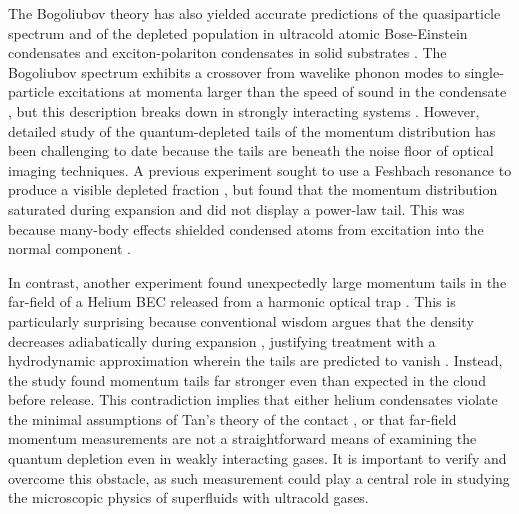 The Bogoliubov theory has also yielded accurate predictions of the quasiparticle spectrum \cite{lopes17_quasiparticle,vogels02} and of the depleted population in ultracold atomic Bose-Einstein condensates \cite{xu06,lopes17_depletion} and exciton-polariton condensates in solid substrates \cite{pieczarka20}. The Bogoliubov spectrum exhibits a crossover from wavelike phonon modes to single-particle excitations at momenta larger than the speed of sound in the condensate \cite{steinhauer03}, but this description breaks down in strongly interacting systems \cite{lopes17_quasiparticle}. However, detailed study of the quantum-depleted tails of the momentum distribution has been challenging to date because the tails are beneath the noise floor of optical imaging techniques. A previous experiment sought to use a Feshbach resonance to produce a visible depleted fraction \cite{makotyn14}, but found that the momentum distribution saturated during expansion and did not display a power-law tail. This was because many-body effects shielded condensed atoms from excitation into the normal component \cite{kira15_hyperbolic,kira15_coherent}.


In contrast, another experiment found unexpectedly large momentum tails in the far-field of a Helium BEC released from a harmonic optical trap \cite{chang16}. This is particularly surprising because conventional wisdom argues that the density decreases adiabatically during expansion \cite{xu06}, justifying treatment with a hydrodynamic approximation wherein the tails are predicted to vanish \cite{qu16}. Instead, the study \cite{chang16} found momentum tails far stronger even than expected in the cloud before release. This contradiction implies that either helium condensates violate the minimal assumptions of Tan's theory of the contact \cite{tan08_energetics,tan08_momentum,tan08_virial}, or that far-field momentum measurements are not a straightforward means of examining the quantum depletion even in weakly interacting gases. It is important to verify and overcome this obstacle, as such measurement could play a central role in studying the microscopic physics of superfluids with ultracold gases.


